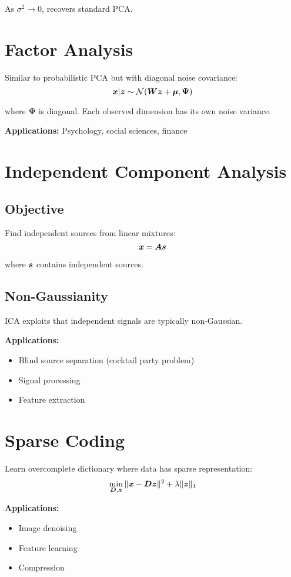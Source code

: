 As $\sigma^2 \to 0$, recovers standard PCA.

\section{Factor Analysis}
\label{sec:factor-analysis}

Similar to probabilistic PCA but with diagonal noise covariance:
\begin{equation}
\boldsymbol{x} | \boldsymbol{z} \sim \mathcal{N}(\boldsymbol{W}\boldsymbol{z} + \boldsymbol{\mu}, \boldsymbol{\Psi})
\end{equation}

where $\boldsymbol{\Psi}$ is diagonal. Each observed dimension has its own noise variance.

\textbf{Applications:} Psychology, social sciences, finance

\section{Independent Component Analysis}
\label{sec:ica}

\subsection{Objective}

Find independent sources from linear mixtures:
\begin{equation}
\boldsymbol{x} = \boldsymbol{A}\boldsymbol{s}
\end{equation}

where $\boldsymbol{s}$ contains independent sources.

\subsection{Non-Gaussianity}

ICA exploits that independent signals are typically non-Gaussian.

\textbf{Applications:}
\begin{itemize}
    \item Blind source separation (cocktail party problem)
    \item Signal processing
    \item Feature extraction
\end{itemize}

\section{Sparse Coding}
\label{sec:sparse-coding}

Learn overcomplete dictionary where data has sparse representation:
\begin{equation}
\min_{\boldsymbol{D}, \boldsymbol{z}} \|\boldsymbol{x} - \boldsymbol{D}\boldsymbol{z}\|^2 + \lambda \|\boldsymbol{z}\|_1
\end{equation}

\textbf{Applications:}
\begin{itemize}
    \item Image denoising
    \item Feature learning
    \item Compression
\end{itemize}
